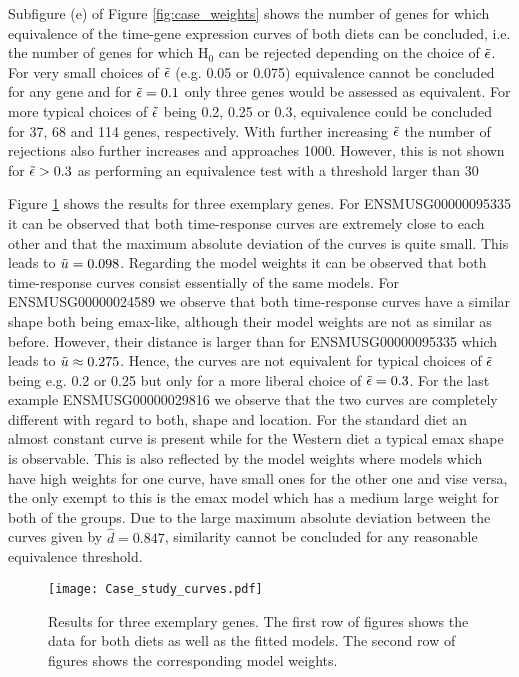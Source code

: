 {Subfigure (e) of Figure \ref{fig:case_weights} shows the number of genes for which equivalence of the time-gene expression curves of both diets can be concluded, i.e. the number of genes for which H$_0$ can be rejected depending on the choice of $\Tilde{\epsilon}$. For very small choices of $\Tilde{\epsilon}$ (e.g. 0.05 or 0.075)  equivalence cannot be concluded for any gene and for $\Tilde{\epsilon} = 0.1$ only three genes would be assessed as equivalent. 
For more typical choices of $\Tilde{\epsilon}$ being 0.2, 0.25 or 0.3, equivalence could be concluded for 37, 68 and 114 genes, respectively. With further increasing $\Tilde{\epsilon}$ the number of rejections also further increases and approaches 1000. However, this is not shown for $\Tilde{\epsilon} > 0.3$ as performing an equivalence test with a threshold larger than 30 \

Figure \ref{fig:case_curves} shows the results for three exemplary genes. For ENSMUSG00000095335 it can be observed that both time-response curves are extremely close to each other and that the maximum absolute deviation of the curves is quite small. This leads to $\Tilde{u}=0.098$. Regarding the model weights it can be observed that both time-response curves consist essentially of the same models. 
For ENSMUSG00000024589 we observe that both time-response curves have a similar shape both being emax-like, although their model weights are not as similar as before. However, their distance is larger than for ENSMUSG00000095335 which leads to $\Tilde{u} \approx 0.275$. Hence, the curves are not equivalent for typical choices of $\Tilde{\epsilon}$ being e.g. 0.2 or 0.25 but only for a more liberal choice of $\Tilde{\epsilon}= 0.3$. For the last example ENSMUSG00000029816 we observe that the two curves are completely different with regard to both, shape and location. For the standard diet an almost constant curve is present while for the Western diet a typical emax shape is observable. This is also reflected by the model weights where models which have high weights for one curve, have small ones for the other one and vise versa, the only exempt to this is the emax model which has a medium large weight for both of the groups. Due to the large maximum absolute deviation between the curves given by $\hat d=0.847$, similarity cannot be concluded for any reasonable equivalence threshold.  
\begin{figure}
        \centering
        \texttt{[image: Case\_study\_curves.pdf]} 
        \caption{Results for three exemplary genes. The first row of figures shows the data for both diets as well as the fitted models. The second row of figures shows the corresponding model weights.}
        \label{fig:case_curves} 
\end{figure}

}
